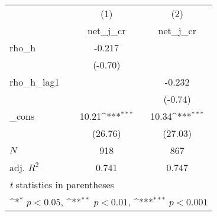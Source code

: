{
\def\sym#1{\ifmmode^{#1}\else\(^{#1}\)\fi}
\begin{tabular}{l*{2}{c}}
\toprule
            &\multicolumn{1}{c}{(1)}&\multicolumn{1}{c}{(2)}\\
            &\multicolumn{1}{c}{net\_j\_cr}&\multicolumn{1}{c}{net\_j\_cr}\\
\midrule
rho\_h       &      -0.217         &                     \\
            &     (-0.70)         &                     \\
\addlinespace
rho\_h\_lag1  &                     &      -0.232         \\
            &                     &     (-0.74)         \\
\addlinespace
\_cons      &       10.21\sym{***}&       10.34\sym{***}\\
            &     (26.76)         &     (27.03)         \\
\midrule
\(N\)       &         918         &         867         \\
adj. \(R^{2}\)&       0.741         &       0.747         \\
\bottomrule
\multicolumn{3}{l}{\footnotesize \textit{t} statistics in parentheses}\\
\multicolumn{3}{l}{\footnotesize \sym{*} \(p<0.05\), \sym{**} \(p<0.01\), \sym{***} \(p<0.001\)}\\
\end{tabular}
}
